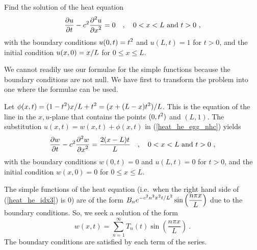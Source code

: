 \begin{egg}
Find the solution of the heat equation
\begin{equation} \label{heat_he_egg_nhc}
\frac{\partial{u}}{\partial t} - c^2 \frac{\displaystyle \partial^{2}{u}} {\displaystyle \partial x^{2}} = 0 \quad , \quad 0 < x < L
  \ \text{and} \ t > 0 \ ,
\end{equation}
with the boundary conditions $\displaystyle u(0,t) = t^2$ and $u(L,t) = 1$ for
$t>0$, and the initial condition $\displaystyle u(x,0) = x/L$
for $0 \leq x \leq L$.

We cannot readily use our formulae for the simple functions because
the boundary conditions are not null.  We have first to transform the
problem into one where the formulae can be used.

Let $\displaystyle \phi(x,t) = (1-t^2)x/L + t^2 = (x+(L-x)t^2)/L$.
This is the equation of the line in the $x,u$-plane that contains the
points $\displaystyle (0,t^2)$ and $(L,1)$.  The substitution
$u(x,t) = w(x,t) + \phi(x,t)$ in (\ref{heat_he_egg_nhc}) yields
\begin{equation} \label{heat_he_idx3}
\frac{\partial{w}}{\partial t} - c^2 \frac{\displaystyle \partial^{2}{w}} {\displaystyle \partial x^{2}} = \frac{2(x-L)t}{L} \quad ,
\quad 0 < x < L \ \text{and} \ t>0 \ ,
\end{equation}
with the boundary conditions
$w(0,t) = 0$ and $u(L,t) = 0$ for $t>0$, and the initial condition
$w(x,0) = 0$ for $0 \leq x \leq L$.

The simple functions of the heat equation
(i.e.\ when the right hand side of (\ref{heat_he_idx3}) is $0$) are of
the form
$\displaystyle B_n e^{-c^2n^2\pi^2t/L^2} \sin\left(\frac{n\pi x}{L}\right)$
due to the boundary conditions.  So, we seek a solution of the form
\begin{equation} \label{heat_he_idx1}
w(x,t) = \sum_{n=1}^\infty T_n(t) \sin\left(\frac{n\pi x}{L}\right) \ .
\end{equation}
The boundary conditions are satisfied by each term of the series.


\end{egg}
